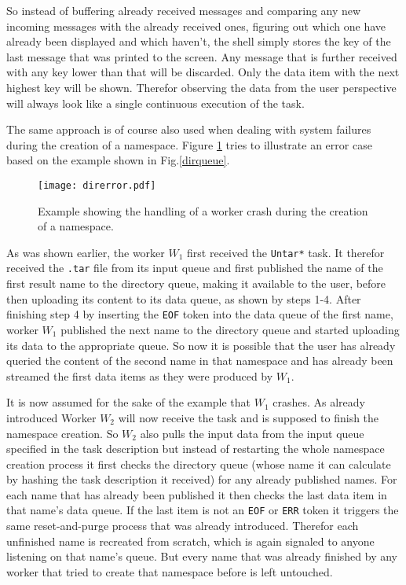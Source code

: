 So instead of buffering already received messages and comparing
any new incoming messages with the already received ones, figuring
out which one have already been displayed and which haven't, the
shell simply stores the key of the last message that was printed
to the screen. Any message that is further received with any key
lower than that will be discarded. Only the data item with the
next highest key will be shown. Therefor observing the data
from the user perspective will always look like a single
continuous execution of the task.
\newline

The same approach is of course also used when dealing with system failures
during the creation of a namespace. Figure \ref{direrror} tries
to illustrate an error case based on the example shown in
Fig.\ref{dirqueue}.

\begin{figure}[h]
  \texttt{[image: direrror.pdf]}
  \caption{Example showing the handling of a worker crash during
           the creation of a namespace.}
  \label{direrror}
\end{figure}

As was shown earlier, the worker $W_{1}$ first received the
\texttt{Untar*} task. It therefor received the \texttt{.tar} file
from its input queue and first published the name of the first
result name to the directory queue, making it available to
the user, before then uploading its content to its data queue,
as shown by steps 1-4. After finishing step 4 by inserting
the \texttt{EOF} token into the data queue of the first name, worker
$W_{1}$ published the next name to the directory queue and
started uploading its data to the appropriate queue. So now
it is possible that the user has already queried the content
of the second name in that namespace and has already been streamed
the first data items as they were produced by $W_{1}$.

It is now assumed for the sake of the example that $W_{1}$ crashes.
As already introduced Worker $W_{2}$ will
now receive the task and is supposed to finish the
namespace creation. So $W_{2}$ also pulls the input data
from the input queue specified in the task description but
instead of restarting the whole namespace creation process it
first checks the directory queue (whose name it can calculate
by hashing the task description it received) for any already
published names. For each name that has already been published
it then checks the last data item in that name's data queue.
If the last item is not an \texttt{EOF} or \texttt{ERR} token
it triggers the same reset-and-purge process that was already
introduced. Therefor each unfinished name is recreated from scratch,
which is again signaled to anyone listening on that name's queue.
But every name that was already finished by any worker that tried
to create that namespace before is left untouched.

